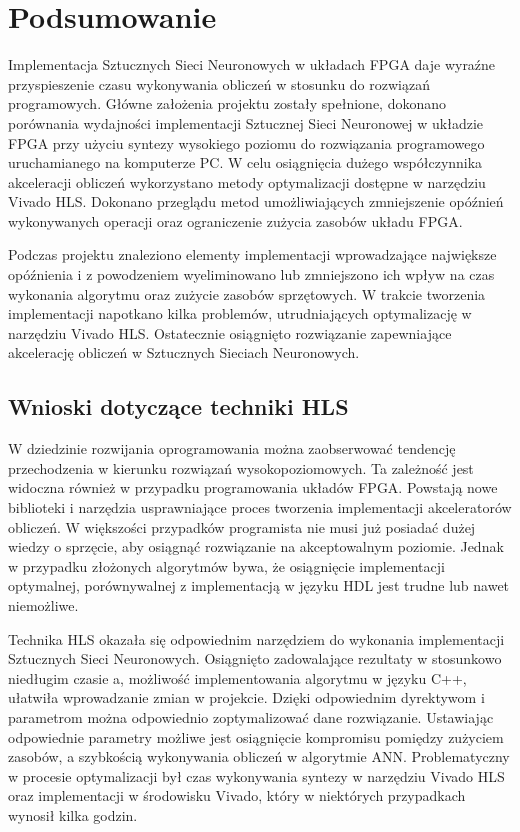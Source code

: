 \newpage %
\cleardoublepage %
\pagestyle{headings}

\section{Podsumowanie}

Implementacja Sztucznych Sieci Neuronowych w układach FPGA daje wyraźne przyspieszenie czasu wykonywania obliczeń w stosunku do rozwiązań programowych. Główne założenia projektu zostały spełnione, dokonano porównania wydajności implementacji Sztucznej Sieci Neuronowej w układzie FPGA przy użyciu syntezy wysokiego poziomu do rozwiązania programowego uruchamianego na komputerze PC. W celu osiągnięcia dużego współczynnika akceleracji obliczeń wykorzystano metody optymalizacji dostępne w narzędziu Vivado HLS. Dokonano przeglądu metod umożliwiających zmniejszenie opóźnień wykonywanych operacji oraz ograniczenie zużycia zasobów układu FPGA.

Podczas projektu znaleziono elementy implementacji wprowadzające największe opóźnienia i z powodzeniem wyeliminowano lub zmniejszono ich wpływ na czas wykonania algorytmu oraz zużycie zasobów sprzętowych. W trakcie tworzenia implementacji napotkano kilka problemów, utrudniających optymalizację w narzędziu Vivado HLS. Ostatecznie osiągnięto rozwiązanie zapewniające akcelerację obliczeń w Sztucznych Sieciach Neuronowych. 


\subsection{Wnioski dotyczące techniki HLS}
W dziedzinie rozwijania oprogramowania można zaobserwować tendencję przechodzenia w kierunku rozwiązań wysokopoziomowych. Ta zależność jest widoczna również w przypadku programowania układów FPGA. Powstają nowe biblioteki i narzędzia usprawniające proces tworzenia implementacji akceleratorów obliczeń. W większości przypadków programista nie musi już posiadać dużej wiedzy o sprzęcie, aby osiągnąć rozwiązanie na akceptowalnym poziomie. Jednak w przypadku złożonych algorytmów bywa, że osiągnięcie implementacji optymalnej, porównywalnej z implementacją w języku HDL jest trudne lub nawet niemożliwe.

Technika HLS okazała się odpowiednim narzędziem do wykonania implementacji Sztucznych Sieci Neuronowych. Osiągnięto zadowalające rezultaty w stosunkowo niedługim czasie a, możliwość implementowania algorytmu w języku C++, ułatwiła wprowadzanie zmian w projekcie. Dzięki odpowiednim dyrektywom i parametrom można odpowiednio zoptymalizować dane rozwiązanie. Ustawiając odpowiednie parametry możliwe jest osiągnięcie kompromisu pomiędzy zużyciem zasobów, a szybkością wykonywania obliczeń w algorytmie ANN. Problematyczny w procesie optymalizacji był czas wykonywania syntezy w narzędziu Vivado HLS oraz implementacji w środowisku Vivado, który w niektórych przypadkach wynosił kilka godzin. 

